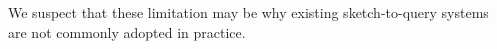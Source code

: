 We suspect that these limitation may be why existing sketch-to-query systems are not commonly adopted in practice. %

